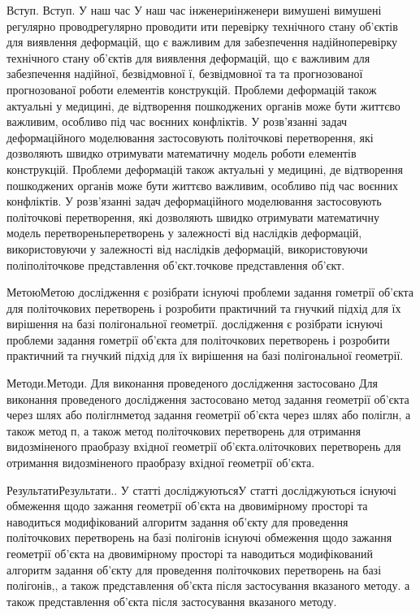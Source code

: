 \documentclass[12pt,a4paper]{article}
\begin{document}
\par
Вступ. Вступ. У наш час У наш час інженериінженери вимушені  вимушені регулярно проводрегулярно проводити ити перевірку технічного стану об'єктів для виявлення деформацій, що є важливим для забезпечення надійноперевірку технічного стану об'єктів для виявлення деформацій, що є важливим для забезпечення надійної, безвідмовної ї, безвідмовної та та прогнозованої прогнозованої роботи елементів конструкцій. Проблеми деформацій також актуальні у медицині, де відтворення пошкоджених органів може бути життєво важливим, особливо під час воєнних конфліктів. У розв'язанні задач деформаційного моделювання застосовують політочкові перетворення, які дозволяють швидко отримувати математичну модель роботи елементів конструкцій. Проблеми деформацій також актуальні у медицині, де відтворення пошкоджених органів може бути життєво важливим, особливо під час воєнних конфліктів. У розв'язанні задач деформаційного моделювання застосовують політочкові перетворення, які дозволяють швидко отримувати математичну модель перетвореньперетворень у залежності від наслідків деформацій, використовуючи  у залежності від наслідків деформацій, використовуючи поліполіточкове представлення об'єкт.точкове представлення об'єкт.
\par
МетоюМетою дослідження є розібрати існуючі проблеми задання гометрії об’єкта для політочкових перетворень і розробити практичний та гнучкий підхід для їх вирішення на базі полігональної геометрії. дослідження є розібрати існуючі проблеми задання гометрії об’єкта для політочкових перетворень і розробити практичний та гнучкий підхід для їх вирішення на базі полігональної геометрії.
\par
Методи.Методи. Для виконання проведеного дослідження застосовано  Для виконання проведеного дослідження застосовано метод задання геометрії об’єкта через шлях або поліглнметод задання геометрії об’єкта через шлях або поліглн, а також метод п, а також метод політочкових перетворень для отримання видозміненого праобразу вхідної геометрії об’єкта.оліточкових перетворень для отримання видозміненого праобразу вхідної геометрії об’єкта.
\par
РезультатиРезультати..  У статті досліджуютьсяУ статті досліджуються існуючі обмеження щодо зажання геометрії об’єкта на двовимірному просторі та наводиться модифікований алгоритм задання об’єкту для проведення політочкових перетворень на базі полігонів існуючі обмеження щодо зажання геометрії об’єкта на двовимірному просторі та наводиться модифікований алгоритм задання об’єкту для проведення політочкових перетворень на базі полігонів,, а також представлення об’єкта після застосування вказаного методу. а також представлення об’єкта після застосування вказаного методу.
\end{document}
